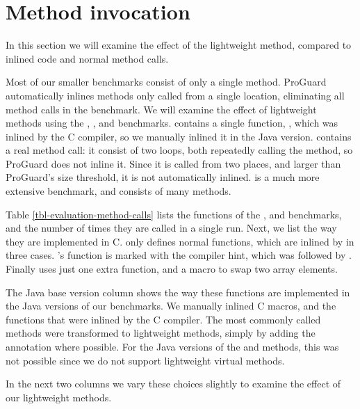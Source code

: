 \section{Method invocation}
\label{sec-evaluation-method-invocation}


In this section we will examine the effect of the lightweight method, compared to inlined code and normal method calls.

Most of our smaller benchmarks consist of only a single method. ProGuard automatically inlines methods only called from a single location, eliminating all method calls in the  benchmark. We will examine the effect of lightweight methods using the , , and  benchmarks.
 contains a single function, , which was inlined by the C compiler, so we manually inlined it in the Java version.  contains a real method call: it consist of two loops, both repeatedly calling the  method, so ProGuard does not inline it. Since it is called from two places, and larger than ProGuard's size threshold, it is not automatically inlined.  is a much more extensive benchmark, and consists of many methods.

Table \ref{tbl-evaluation-method-calls} lists the functions of the ,  and  benchmarks, and the number of times they are called in a single run. Next, we list the way they are implemented in C.  only defines normal functions, which are inlined by  in three cases. 's  function is marked with the  compiler hint, which was followed by . Finally  uses just one extra function, and a macro to swap two array elements.

The Java base version column shows the way these functions are implemented in the Java versions of our benchmarks. We manually inlined C macros, and the functions that were inlined by the C compiler. The most commonly called methods were transformed to lightweight methods, simply by adding the  annotation where possible. For the Java versions of the  and  methods, this was not possible since we do not support lightweight virtual methods.

In the next two columns we vary these choices slightly to examine the effect of our lightweight methods.

